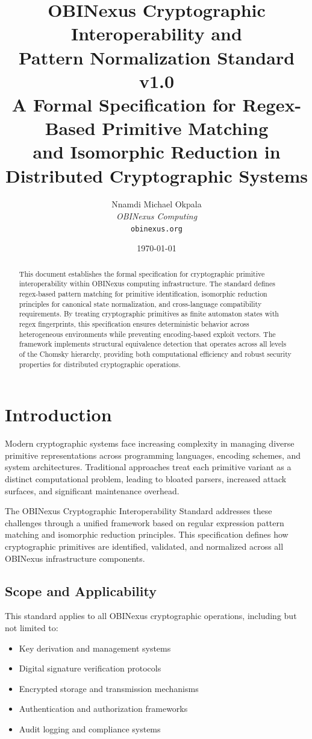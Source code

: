 \documentclass[11pt,a4paper]{article}
\title{
    \textbf{OBINexus Cryptographic Interoperability and\\
    Pattern Normalization Standard v1.0}\\
    \large A Formal Specification for Regex-Based Primitive Matching\\
    and Isomorphic Reduction in Distributed Cryptographic Systems
}
\author{
    Nnamdi Michael Okpala\\
    \textit{OBINexus Computing}\\
    \texttt{obinexus.org}
}
\date{\today}
\begin{document}
\maketitle

\begin{abstract}
This document establishes the formal specification for cryptographic primitive interoperability within OBINexus computing infrastructure. The standard defines regex-based pattern matching for primitive identification, isomorphic reduction principles for canonical state normalization, and cross-language compatibility requirements. By treating cryptographic primitives as finite automaton states with regex fingerprints, this specification ensures deterministic behavior across heterogeneous environments while preventing encoding-based exploit vectors. The framework implements structural equivalence detection that operates across all levels of the Chomsky hierarchy, providing both computational efficiency and robust security properties for distributed cryptographic operations.
\end{abstract}

\tableofcontents
\newpage

\section{Introduction}

Modern cryptographic systems face increasing complexity in managing diverse primitive representations across programming languages, encoding schemes, and system architectures. Traditional approaches treat each primitive variant as a distinct computational problem, leading to bloated parsers, increased attack surfaces, and significant maintenance overhead.

The OBINexus Cryptographic Interoperability Standard addresses these challenges through a unified framework based on regular expression pattern matching and isomorphic reduction principles. This specification defines how cryptographic primitives are identified, validated, and normalized across all OBINexus infrastructure components.

\subsection{Scope and Applicability}

This standard applies to all OBINexus cryptographic operations, including but not limited to:
\begin{itemize}
    \item Key derivation and management systems
    \item Digital signature verification protocols
    \item Encrypted storage and transmission mechanisms
    \item Authentication and authorization frameworks
    \item Audit logging and compliance systems
\end{itemize}
\end{document}
